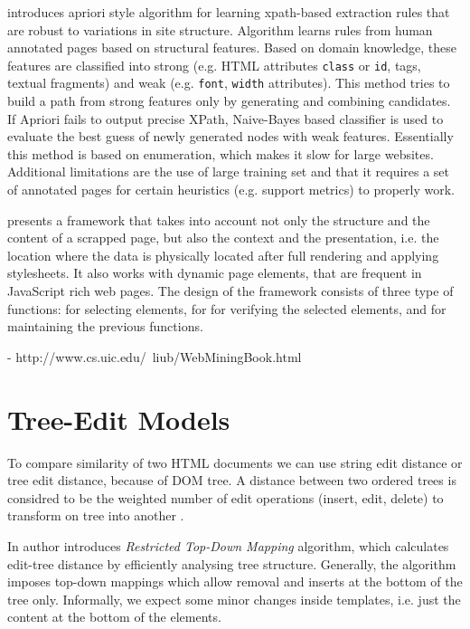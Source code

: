 \cite{DBLP:conf/icde/GulhaneMMRRSSTT11} introduces apriori style algorithm for learning xpath-based extraction rules that are robust to variations in site structure. Algorithm learns rules from human annotated pages based on structural features. Based on domain knowledge, these features are classified into strong (e.g. HTML attributes \texttt{class} or \texttt{id}, tags, textual fragments) and weak (e.g. \texttt{font}, \texttt{width} attributes). This method tries to build a path from strong features only by generating and combining candidates. If Apriori fails to output precise XPath, Naive-Bayes based classifier is used to evaluate the best guess of newly generated nodes with weak features. Essentially this method is based on enumeration, which makes it slow for large websites. Additional limitations are the use of large training set and that it requires a set of annotated pages for certain heuristics (e.g. support metrics) to properly work. 

\cite{Thomsen:2012:WWS:2364120.2364156} presents a framework that takes into account not only the structure and the content of a scrapped page, but also the context and the presentation, i.e. the location where the data is physically located after full rendering and applying stylesheets. It also works with dynamic page elements, that are frequent in JavaScript rich web pages. The design of the framework consists of three type of functions: for selecting elements, for for verifying the selected elements, and for maintaining the previous functions.

- http://www.cs.uic.edu/~liub/WebMiningBook.html\\


\section{Tree-Edit Models}

To compare similarity of two HTML documents we can use string edit distance or tree edit distance, because of DOM tree. A distance between two ordered trees is considred to be the weighted number of edit operations (insert, edit, delete) to transform on tree into another \cite{shasha1990a}.

In \cite{de2004a} author introduces \emph{Restricted Top-Down Mapping} algorithm, which calculates edit-tree distance by efficiently analysing tree structure. Generally, the algorithm imposes top-down mappings which allow removal and inserts at the bottom of the tree only. Informally, we expect some minor changes inside templates, i.e. just the content at the bottom of the elements.

